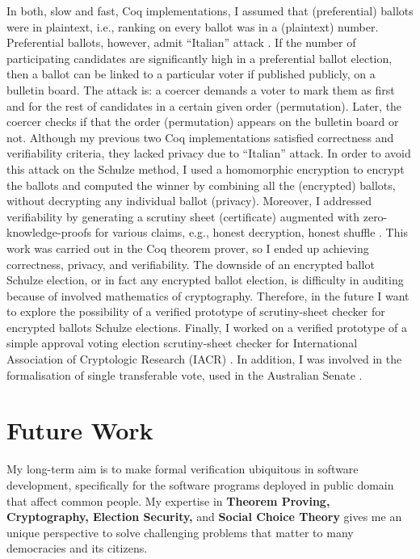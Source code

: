 \documentclass[a4paper]{article}
\begin{document}
In both, slow and fast, Coq implementations, I assumed that (preferential) ballots were in plaintext, i.e., 
ranking on every ballot was in a (plaintext) number.  Preferential ballots, 
however, admit ``Italian'' attack \cite{Otten, Benaloh:2009:SSC}. 
If the number of participating candidates are significantly high in 
a preferential ballot election,
then a ballot can be linked to a particular voter if published publicly, on a bulletin board.
The attack is: a coercer demands a voter to mark them as first and for the rest of candidates
in a certain given order (permutation). Later, the coercer checks if that the order (permutation) appears 
on the bulletin board or not. Although my previous two Coq implementations \cite{10.1007/978-3-319-66107-0_26, bennett2017no} 
satisfied correctness and verifiability criteria, they lacked privacy due to ``Italian'' attack. 
In order to avoid this attack on the Schulze method, I used a homomorphic encryption 
to encrypt the ballots and computed the winner by combining all the 
(encrypted) ballots, without decrypting any individual ballot (privacy). 
Moreover, I addressed verifiability by generating a scrutiny sheet (certificate) 
augmented with zero-knowledge-proofs for various claims, e.g., honest decryption, honest shuffle \cite{10.1007/978-3-030-41600-3_4}. 
This work was carried out in the Coq theorem prover, so I ended up achieving
correctness, privacy, and verifiability. The downside of an encrypted ballot Schulze election, 
or in fact any encrypted ballot election, is difficulty in auditing because of involved 
mathematics of cryptography. Therefore, in the future I want to explore the possibility of a 
verified prototype of scrutiny-sheet checker for encrypted ballots Schulze elections.
Finally, I worked on a verified prototype of a simple approval voting election scrutiny-sheet checker for
International Association of Cryptologic Research (IACR) \cite{10.1145/3319535.3354247}. 
In addition, I was involved in the formalisation of single transferable vote, used in the Australian Senate
\cite{10.1007/978-3-030-00419-4_4}.


\section{Future Work}
My long-term aim is to make formal verification ubiquitous in 
software development, specifically for the software programs deployed in public domain
that affect common people.
My expertise in \textbf{Theorem Proving, Cryptography, Election Security,} and \textbf{Social Choice Theory}
gives me an unique perspective to solve challenging problems that matter to many democracies 
and its citizens. 
\end{document}
